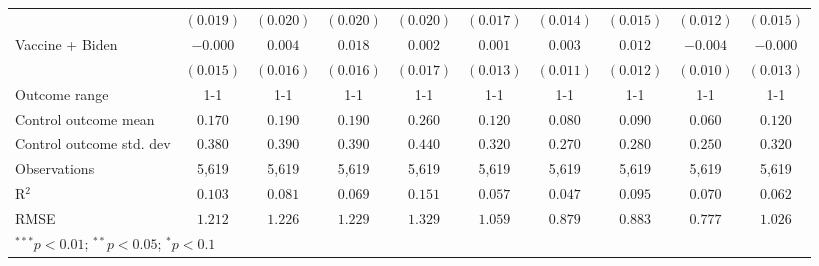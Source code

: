 \begin{table}
\begin{center}
\begin{tabular}{l c c c c c c c c c}
                              & $(0.019)$    & $(0.020)$ & $(0.020)$ & $(0.020)$    & $(0.017)$ & $(0.014)$ & $(0.015)$     & $(0.012)$ & $(0.015)$     \\
Vaccine + Biden               & $-0.000$     & $0.004$   & $0.018$   & $0.002$      & $0.001$   & $0.003$   & $0.012$       & $-0.004$  & $-0.000$      \\
                              & $(0.015)$    & $(0.016)$ & $(0.016)$ & $(0.017)$    & $(0.013)$ & $(0.011)$ & $(0.012)$     & $(0.010)$ & $(0.013)$     \\
\hline
Outcome range                 & 1-1          & 1-1       & 1-1       & 1-1          & 1-1       & 1-1       & 1-1           & 1-1       & 1-1           \\
Control outcome mean          & $0.170$      & $0.190$   & $0.190$   & $0.260$      & $0.120$   & $0.080$   & $0.090$       & $0.060$   & $0.120$       \\
Control outcome std. dev      & $0.380$      & $0.390$   & $0.390$   & $0.440$      & $0.320$   & $0.270$   & $0.280$       & $0.250$   & $0.320$       \\
Observations                  & 5,619        & 5,619     & 5,619     & 5,619        & 5,619     & 5,619     & 5,619         & 5,619     & 5,619         \\
R$^{2}$                       & $0.103$      & $0.081$   & $0.069$   & $0.151$      & $0.057$   & $0.047$   & $0.095$       & $0.070$   & $0.062$       \\
RMSE                          & $1.212$      & $1.226$   & $1.229$   & $1.329$      & $1.059$   & $0.879$   & $0.883$       & $0.777$   & $1.026$       \\
\hline
\multicolumn{10}{l}{\scriptsize{$^{***}p<0.01$; $^{**}p<0.05$; $^{*}p<0.1$}}
\end{tabular}
\caption{}
\label{table:Tables and Figures/SI_table16_reasonschange}
\end{center}
\end{table}
